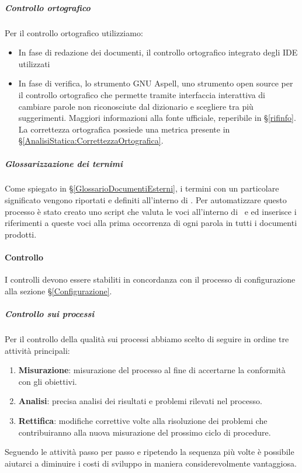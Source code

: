 			\subparagraph{Controllo ortografico}
			Per il controllo ortografico utilizziamo:
			\begin{itemize}
				\item In fase di redazione dei documenti, il controllo ortografico integrato degli IDE utilizzati
				\item In fase di verifica, lo strumento GNU Aspell, uno strumento open source per il controllo ortografico che permette tramite interfaccia interattiva di cambiare parole non riconosciute dal dizionario e scegliere tra più suggerimenti. Maggiori informazioni alla fonte ufficiale, reperibile in \S\ref{rifinfo}.
				La correttezza ortografica possiede una metrica presente in \S\ref{AnalisiStatica:CorrettezzaOrtografica}.
			\end{itemize}

            \subparagraph{Glossarizzazione dei ternimi}
			Come spiegato in \S\ref{GlossarioDocumentiEsterni}, i termini con un particolare significato vengono riportati e definiti all'interno di \Gld. Per automatizzare questo processo è stato creato uno script che valuta le voci all'interno di \Gld\ e ed inserisce i riferimenti a queste voci alla prima occorrenza di ogni parola in tutti i documenti prodotti.

			\paragraph{Controllo}	\label{Controllo}
			I controlli devono essere stabiliti in concordanza con il processo di configurazione alla sezione \S\ref{Configurazione}.

			\subparagraph{Controllo sui processi}	\label{ControlloProcessi}
			Per il controllo della qualità sui processi abbiamo scelto di seguire in ordine tre attività principali:
			\begin{enumerate}
				\item \textbf{Misurazione}: misurazione del processo al fine di accertarne la conformità con gli obiettivi.
				\item \textbf{Analisi}: precisa analisi dei risultati e problemi rilevati nel processo.
				\item \textbf{Rettifica}: modifiche correttive volte alla risoluzione dei problemi che contribuiranno alla nuova misurazione del prossimo ciclo di procedure.
			\end{enumerate}
			Seguendo le attività passo per passo e ripetendo la sequenza più volte è possibile aiutarci a diminuire i costi di sviluppo in maniera considerevolmente vantaggiosa.

